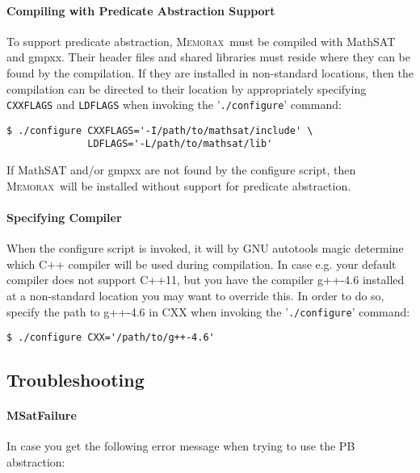 \documentclass[a4paper]{article}
\newcommand{\memorax}{\textsc{Memorax}}
\begin{document}
\paragraph{Compiling with Predicate Abstraction Support}

   To support predicate abstraction, \memorax\ must be compiled with
   MathSAT and gmpxx. Their header files and shared libraries must
   reside where they can be found by the compilation. If they are
   installed in non-standard locations, then the compilation can be
   directed to their location by appropriately specifying
   \verb+CXXFLAGS+ and \verb+LDFLAGS+ when invoking the
   '\verb+./configure+' command:

\begin{verbatim}
$ ./configure CXXFLAGS='-I/path/to/mathsat/include' \
              LDFLAGS='-L/path/to/mathsat/lib'
\end{verbatim}

   If MathSAT and/or gmpxx are not found by the configure script, then
   \memorax\ will be installed without support for predicate abstraction.

\paragraph{Specifying Compiler}

   When the configure script is invoked, it will by GNU autotools
   magic determine which C++ compiler will be used during
   compilation. In case e.g. your default compiler does not support
   C++11, but you have the compiler g++-4.6 installed at a
   non-standard location you may want to override this. In order to do
   so, specify the path to g++-4.6 in CXX when invoking the
   '\verb+./configure+' command:

\begin{verbatim}
$ ./configure CXX='/path/to/g++-4.6'
\end{verbatim}

\subsection{Troubleshooting}

\paragraph{MSatFailure}

   In case you get the following error message when trying to use the
   PB abstraction:
\end{document}
